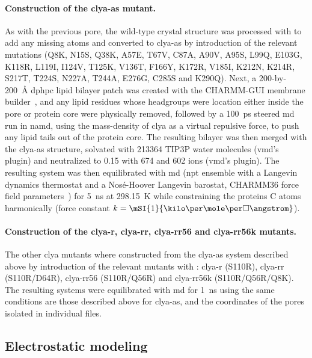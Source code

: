 \paragraph{Construction of the \gls{clya-as} mutant.}
%
As with the previous pore, the wild-type crystal structure was processed with  to add any missing
atoms and converted to \gls{clya-as} by introduction of the relevant mutations (Q8K, N15S, Q38K, A57E, T67V,
C87A, A90V, A95S, L99Q, E103G, K118R, L119I, I124V, T125K, V136T, F166Y, K172R, V185I, K212N, K214R, S217T,
T224S, N227A, T244A, E276G, C285S and K290Q). Next, a 200-by-\SI{200}{\angstrom} \gls{dphpc} lipid bilayer
patch was created with the CHARMM-GUI membrane builder~\cite{Jo-2008,Lee-2015}, and any lipid residues whose
headgroups were location either inside the pore \lumen{} or protein core were physically removed, followed by
a \SI{100}{\ps} steered \gls{md} run in \gls{namd}, using the mass-density of \gls{clya} as a virtual
repulsive force, to push any lipid tails out of the protein core. The resulting bilayer was then merged with
the \gls{clya-as} structure, solvated with 213364 {TIP3P} water molecules (\gls{vmd}'s  plugin)
and neutralized to \SI{0.15}{\Molar} with 674  and 602  ions (\gls{vmd}'s 
plugin). The resulting system was then equilibrated with \gls{md} (\gls{npt} ensemble with a Langevin dynamics
thermostat and a Nos\'{e}-Hoover Langevin barostat, {CHARMM36} force field parameters~\cite{Best-2012}) for
\SI{5}{\ns} at \SI{298.15}{\kelvin} while constraining the proteins C\ta{} atoms harmonically (force constant
$k = \mSI{1}{\kilo\cal\per\mole\per\square\angstrom}$).

\paragraph{Construction of the \gls{clya-r}, \gls{clya-rr}, \gls{clya-rr56} and \gls{clya-rr56k} mutants.}
%
The other \gls{clya} mutants where constructed from the \gls{clya-as} system described above by introduction
of the relevant mutants with : \gls{clya-r} (S110R), \gls{clya-rr} (S110R/D64R), \gls{clya-rr56}
(S110R/Q56R) and \gls{clya-rr56k} (S110R/Q56R/Q8K). The resulting systems were equilibrated with \gls{md} for
\SI{1}{\ns} using the same conditions are those described above for \gls{clya-as}, and the coordinates of the
pores isolated in individual files.


\subsection{Electrostatic modeling}
%
\label{sec:elec:methods:elec}

